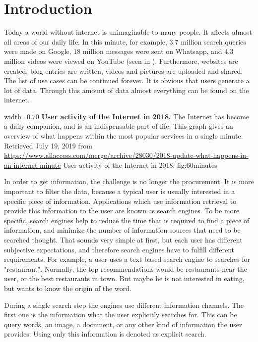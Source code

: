 \chapter{Introduction}
\label{cha:introduction}

Today a world without internet is unimaginable to many people. It affects almost all areas of our daily life. In this minute, for example, $3.7$ million search queries were made on Google, $18$ million messages were sent on Whatsapp, and $4.3$ million videos were viewed on YouTube (seen in ). Furthermore, websites are created, blog entries are written, videos and pictures are uploaded and shared. The list of use cases can be continued forever. It is obvious that users generate a lot of data. Through this amount of data almost everything can be found on the internet.

      {width=0.70\textwidth}
      {\textbf{User activity of the Internet in 2018.} The Internet has become a daily companion, and is an indispensable part of life. This graph gives an overview of what happens within the most popular services in a single minute. Retrieved July 19, 2019 from \url{https://www.allaccess.com/merge/archive/28030/2018-update-what-happens-in-an-internet-minute}}
      {User activity of the Internet in 2018.}
      {fig:60minutes}

In order to get information, the challenge is no longer the procurement. It is more important to filter the data, because a typical user is usually interested in a specific piece of information. Applications which use information retrieval to provide this information to the user are known as search engines. To be more specific, search engines help to reduce the time that is required to find a piece of information, and minimize the number of information sources that need to be searched thought. That sounds very simple at first, but each user has different subjective expectations, and therefore search engines have to fulfill different requirements. For example, a user uses a text based search engine to searches for "restaurant". Normally, the top recommendations would be restaurants near the user, or the best restaurants in town. But maybe he is not interested in eating, but wants to know the origin of the word. %

During a single search step the engines use different information channels. The first one is the information what the user explicitly searches for. This can be query words, an image, a document, or any other kind of information the user provides. Using only this information is denoted as explicit search.

